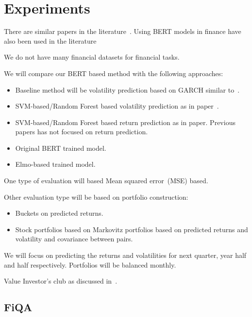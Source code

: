 \documentclass[11pt]{article}
\begin{document}
\section{Experiments}

There are similar papers in the literature~\cite{kogan2009}. Using BERT models in finance have also been used in the literature~\cite{araci2019, yang2020}

We do not have many financial datasets for financial tasks.

We will compare our BERT based method with the following approaches:
\begin{itemize}
\item Baseline method will be volatility prediction based on GARCH similar to~\cite{kogan2009}.
\item SVM-based/Random Forest based volatility prediction as in
  paper~\cite{kogan2009}.
  \item SVM-based/Random Forest based return prediction as in
    paper. Previous papers has not focused on return prediction.
  \item Original BERT trained model.
   \item Elmo-based trained model.
\end{itemize}

One type of evaluation will based Mean squared error~(MSE) based.

Other evaluation type will be based on portfolio construction:
\begin{itemize}
\item Buckets on predicted returns. 
\item Stock portfolios based on Markovitz portfolios based on predicted returns and volatility and covariance between pairs.
\end{itemize}

We will focus on predicting the returns and volatilities for next
quarter, year half and half respectively. Portfolios will be balanced monthly.




Value Investor's club as discussed in~\cite{yang2018}.

\subsection{FiQA}
\end{document}
